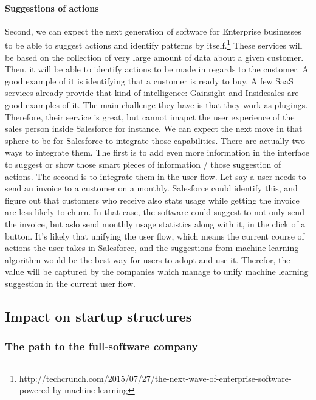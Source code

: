 \documentclass[12pt]{article}
\begin{document}
\paragraph{Suggestions of actions}

Second, we can expect the next generation of software for Enterprise businesses to be able to suggest actions and identify patterns by itself.\footnote{http://techcrunch.com/2015/07/27/the-next-wave-of-enterprise-software-powered-by-machine-learning} These services will be based on the collection of very large amount of data about a given customer. Then, it will be able to identify actions to be made in regards to the customer. A good example of it is identifying that a customer is ready to buy. A few SaaS services already provide that kind of intelligence: \href{http://www.gainsight.com/}{Gainsight} and \href{http://uk.insidesales.com/}{Insidesales} are good examples of it.
The main challenge they have is that they work as plugings. Therefore, their service is great, but cannot imapct the user experience of the sales person inside Salesforce for instance.
We can expect the next move in that sphere to be for Salesforce to integrate those capabilities. There are actually two ways to integrate them. The first is to add even more information in the interface to suggest or show those smart pieces of information / those suggestion of actions. The second is to integrate them in the user flow. Let say a user needs to send an invoice to a customer on a monthly. Salesforce could identify this, and figure out that customers who receive also stats usage while getting the invoice are less likely to churn. In that case, the software could suggest to not only send the invoice, but aslo send monthly usage statistics along with it, in the click of a button.
It's likely that unifying the user flow, which means the current course of actions the user takes in Salesforce, and the suggestions from machine learning algorithm would be the best way for users to adopt and use it. Therefor, the value will be captured by the companies which manage to unify machine learning suggestion in the current user flow.

\subsection{Impact on startup structures}

\subsubsection{The path to the full-software company}
\end{document}
